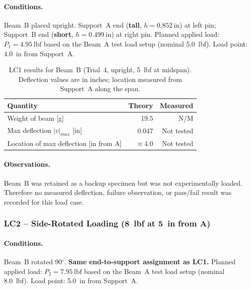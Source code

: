 \documentclass[11pt,letterpaper]{article}
\begin{document}
\paragraph{Conditions.}
Beam~B placed upright.
Support~A end (\textbf{tall}, $h = 0.852\ \mathrm{in}$) at left pin;
Support~B end (\textbf{short}, $h = 0.499\ \mathrm{in}$) at right pin.
Planned applied load: $P_1 = 4.95\ \mathrm{lbf}$ based on the Beam~A test
load setup (nominal 5.0~lbf).
Load point: 4.0~in from Support~A.

\begin{table}[H]
\centering
\caption{LC1 results for Beam~B (Trial~4, upright, 5~lbf at midspan).
Deflection values are in inches; location measured from Support~A along the span.}
\label{tab:testB_lc1}
\begin{tabular}{lrr}
\toprule
Quantity & Theory & Measured \\
\midrule
Weight of beam [g]            & 19.5  & N/M \\
Max deflection $|v|_{max}$ [in] & 0.047 & Not tested \\
Location of max deflection [in from A] & $\approx 4.0$ & Not tested \\
\bottomrule
\end{tabular}
\end{table}

\paragraph{Observations.}
Beam~B was retained as a backup specimen but was not experimentally loaded.
Therefore no measured deflection, failure observation, or pass/fail result was
recorded for this load case.

\subsubsection{LC2 -- Side-Rotated Loading (8~lbf at 5~in from A)}

\paragraph{Conditions.}
Beam~B rotated 90$^\circ$.  \textbf{Same end-to-support assignment as LC1.}
Planned applied load: $P_2 = 7.95\ \mathrm{lbf}$ based on the Beam~A test
load setup (nominal 8.0~lbf).
Load point: 5.0~in from Support~A.
\end{document}
